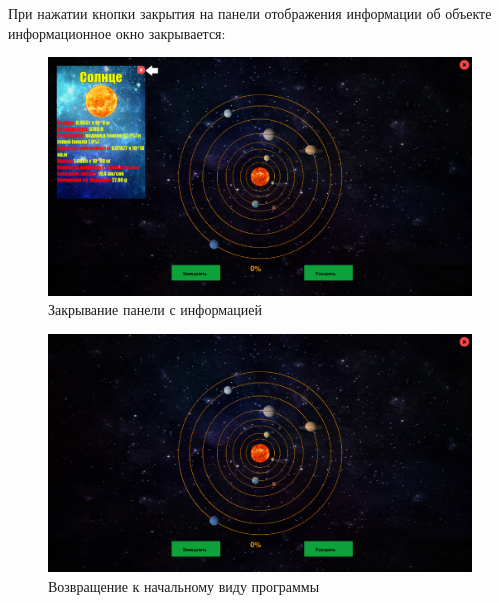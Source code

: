 \documentclass[14pt, oneside]{altsu-report}
\begin{document}
При нажатии кнопки закрытия на панели отображения информации об объекте информационное окно закрывается:
\begin{figure}[H]
    \centering
    \includegraphics[width=0.8\linewidth]{src/test/Нажатие_на_кнопку.png}
    \caption{Закрывание панели с информацией}
    \label{fig:click-close}
\end{figure}
\begin{figure}[H]
    \centering
    \includegraphics[width=0.8\linewidth]{src/test/После_нажатия.png}
    \caption{Возвращение к начальному виду программы}
    \label{fig:after-info}
\end{figure}
\end{document}
